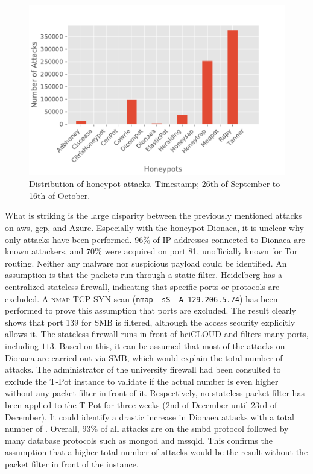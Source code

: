 \begin{figure}[ht]
    \centering
    \includegraphics[width=\textwidth]{figures/tpot-overview-attacks.pdf}
    \caption[Distribution of honeypot attacks]{
        Distribution of honeypot attacks.
        Timestamp; 26th of September to 16th of October.
    }
    \label{fig:overview-attacks}
\end{figure}

What is striking is the large disparity between the previously mentioned attacks on \ac{aws}, \ac{gcp}, and Azure.
Especially with the honeypot Dionaea, it is unclear why only  attacks have been performed.
$96\%$ of IP addresses connected to Dionaea are known attackers, and $70\%$ were acquired on port 81, unofficially known for Tor routing.
Neither any malware nor suspicious payload could be identified.
An assumption is that the packets run through a static filter.
Heidelberg has a centralized stateless firewall, indicating that specific ports or protocols are excluded.
A \textsc{nmap} TCP SYN scan (\verb|nmap -sS -A 129.206.5.74|) has been performed to prove this assumption that ports are excluded.
The result clearly shows that port 139 for SMB is filtered, although the access security explicitly allows it.
The stateless firewall runs in front of heiCLOUD and filters many ports, including $113$.
Based on this, it can be assumed that most of the attacks on Dionaea are carried out via SMB, which would explain the total number of attacks.
The administrator of the university firewall had been consulted to exclude the T-Pot instance to validate if the actual number is even higher without any packet filter in front of it.
Respectively, no stateless packet filter has been applied to the T-Pot for three weeks (2nd of December until 23rd of December).
It could identify a drastic increase in Dionaea attacks with a total number of .
Overall, $93\%$ of all attacks are on the smbd protocol followed by many database protocols such as mongod and mssqld.
This confirms the assumption that a higher total number of attacks would be the result without the packet filter in front of the instance.

